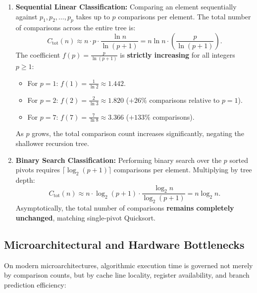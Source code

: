 \begin{enumerate}
  \item \textbf{Sequential Linear Classification:}
  Comparing an element sequentially against $p_1, p_2, \dots, p_p$ takes up to $p$ comparisons per element. The total number of comparisons across the entire tree is:
  \begin{equation}
    C_{\text{tot}}(n) \approx n \cdot p \cdot \frac{\ln n}{\ln(p + 1)} = n \ln n \cdot \left( \frac{p}{\ln(p + 1)} \right).
  \end{equation}
  The coefficient $f(p) = \frac{p}{\ln(p + 1)}$ is \textbf{strictly increasing} for all integers $p \ge 1$:
  \begin{itemize}
    \item For $p = 1$: $f(1) = \frac{1}{\ln 2} \approx 1.442$.
    \item For $p = 2$: $f(2) = \frac{2}{\ln 3} \approx 1.820$ ($+26\%$ comparisons relative to $p=1$).
    \item For $p = 7$: $f(7) = \frac{7}{\ln 8} \approx 3.366$ ($+133\%$ comparisons).
  \end{itemize}
  As $p$ grows, the total comparison count increases significantly, negating the shallower recursion tree.

  \item \textbf{Binary Search Classification:}
  Performing binary search over the $p$ sorted pivots requires $\lceil \log_2(p + 1) \rceil$ comparisons per element. Multiplying by tree depth:
  \begin{equation}
    C_{\text{tot}}(n) \approx n \cdot \log_2(p + 1) \cdot \frac{\log_2 n}{\log_2(p + 1)} = n \log_2 n.
  \end{equation}
  Asymptotically, the total number of comparisons \textbf{remains completely unchanged}, matching single-pivot Quicksort.
\end{enumerate}

\subsection{Microarchitectural and Hardware Bottlenecks}
\label{subsec:hardware-bottlenecks}

On modern microarchitectures, algorithmic execution time is governed not merely by comparison counts, but by cache line locality, register availability, and branch prediction efficiency:

